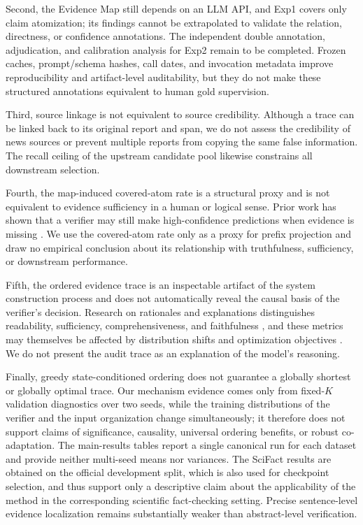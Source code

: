 \documentclass[letterpaper]{article}
\begin{document}
Second, the Evidence Map still depends on an LLM API, and Exp1 covers only claim atomization; its findings cannot be extrapolated to validate the relation, directness, or confidence annotations. The independent double annotation, adjudication, and calibration analysis for Exp2 remain to be completed. Frozen caches, prompt/schema hashes, call dates, and invocation metadata improve reproducibility and artifact-level auditability, but they do not make these structured annotations equivalent to human gold supervision.

Third, source linkage is not equivalent to source credibility. Although a trace can be linked back to its original report and span, we do not assess the credibility of news sources or prevent multiple reports from copying the same false information. The recall ceiling of the upstream candidate pool likewise constrains all downstream selection.

Fourth, the map-induced covered-atom rate is a structural proxy and is not equivalent to evidence sufficiency in a human or logical sense. Prior work has shown that a verifier may still make high-confidence predictions when evidence is missing \citep{Atanasova2022Insufficient}. We use the covered-atom rate only as a proxy for prefix projection and draw no empirical conclusion about its relationship with truthfulness, sufficiency, or downstream performance.

Fifth, the ordered evidence trace is an inspectable artifact of the system construction process and does not automatically reveal the causal basis of the verifier's decision. Research on rationales and explanations distinguishes readability, sufficiency, comprehensiveness, and faithfulness \citep{Lei2016Rationalizing,DeYoung2020ERASER,Jacovi2020Faithfulness}, and these metrics may themselves be affected by distribution shifts and optimization objectives \citep{Hsia2024Goodhart}. We do not present the audit trace as an explanation of the model's reasoning.

Finally, greedy state-conditioned ordering does not guarantee a globally shortest or globally optimal trace. Our mechanism evidence comes only from fixed-$K$ validation diagnostics over two seeds, while the training distributions of the verifier and the input organization change simultaneously; it therefore does not support claims of significance, causality, universal ordering benefits, or robust co-adaptation. The main-results tables report a single canonical run for each dataset and provide neither multi-seed means nor variances. The SciFact results are obtained on the official development split, which is also used for checkpoint selection, and thus support only a descriptive claim about the applicability of the method in the corresponding scientific fact-checking setting. Precise sentence-level evidence localization remains substantially weaker than abstract-level verification.
\end{document}
